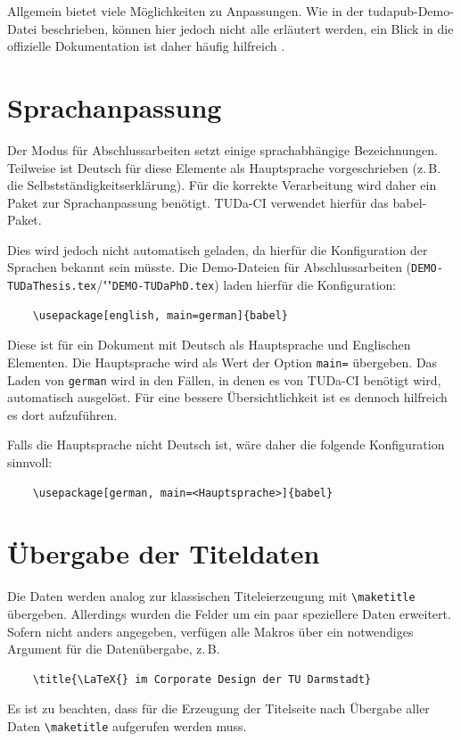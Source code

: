 \documentclass[
	ngerman,%
	accentcolor=9c,%
	ruledheaders=chapter,%
	class=book,%
	thesis={%
		type=dr,
		dr=rernat
	},
	fontsize=11pt,%
	parskip=half-,%
	custommargins=true,%
	marginpar=false,%
]{tudapub}
\newcommand*{\file}[1]{\texttt{#1}}
\begin{document}
Allgemein bietet \KOMAScript{} viele Möglichkeiten zu Anpassungen. Wie in der tudapub-Demo-Datei beschrieben, können hier jedoch nicht alle erläutert werden, ein Blick in die offizielle Dokumentation ist daher häufig hilfreich \cite{scrguide}.

\section{Sprachanpassung}
Der Modus für Abschlussarbeiten setzt einige sprachabhängige Bezeichnungen.
Teilweise ist Deutsch für diese Elemente als Hauptsprache vorgeschrieben (z.\,B. die Selbstständigkeitserklärung). Für die korrekte Verarbeitung wird daher ein Paket zur Sprachanpassung benötigt.
TUDa-CI verwendet hierfür das babel-Paket.

Dies wird jedoch nicht automatisch geladen, da hierfür die Konfiguration der Sprachen bekannt sein müsste. Die Demo-Dateien für Abschlussarbeiten (\file{DEMO-TUDaThesis.tex}/""\file{DEMO-TUDaPhD.tex}) laden hierfür die Konfiguration:
\begin{verbatim}
    \usepackage[english, main=german]{babel}
\end{verbatim}
Diese ist für ein Dokument mit Deutsch als Hauptsprache und Englischen Elementen.
Die Hauptsprache wird als Wert der Option \verb+main=+ übergeben.
Das Laden von \verb+german+ wird in den Fällen, in denen es von TUDa-CI benötigt wird, automatisch ausgelöst.
Für eine bessere Übersichtlichkeit ist es dennoch hilfreich es dort aufzuführen.

Falls die Hauptsprache nicht Deutsch ist, wäre daher die folgende Konfiguration sinnvoll:
\begin{verbatim}
    \usepackage[german, main=<Hauptsprache>]{babel}
\end{verbatim}

\section{Übergabe der Titeldaten}

Die Daten werden analog zur klassischen Titeleierzeugung mit \verb+\maketitle+ übergeben. Allerdings wurden die Felder um ein paar speziellere Daten erweitert. Sofern nicht anders angegeben, verfügen alle Makros über ein notwendiges Argument für die Datenübergabe, z.\,B.
\begin{verbatim}
    \title{\LaTeX{} im Corporate Design der TU Darmstadt}
\end{verbatim}
Es ist zu beachten, dass für die Erzeugung der Titelseite nach Übergabe aller Daten \verb+\maketitle+ aufgerufen werden muss.
\end{document}
